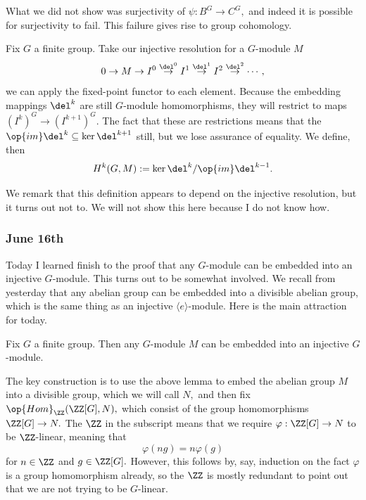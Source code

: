What we did not show was surjectivity of $\psi:B^G\to C^G,$ and indeed it is possible for surjectivity to fail. This failure gives rise to group cohomology.
\begin{definition}
    Fix $G$ a finite group. Take our injective resolution for a $G$-module $M$
    \[0\to M\to I^0\stackrel{\del^0}\to I^1\stackrel{\del^1}\to I^2\stackrel{\del^2}\to\cdots,\]
    we can apply the fixed-point functor to each element. Because the embedding mappings $\del^k$ are still $G$-module homomorphisms, they will restrict to maps $\left(I^k\right)^G\to\left(I^{k+1}\right)^G.$ The fact that these are restrictions means that the $\op{im}\del^k\subseteq\ker\del^{k+1}$ still, but we lose assurance of equality. We define, then
    \[H^k(G,M):=\ker\del^k/\op{im}\del^{k-1}.\]
\end{definition}
We remark that this definition appears to depend on the injective resolution, but it turns out not to. We will not show this here because I do not know how.

\subsubsection{June 16th}
Today I learned finish to the proof that any $G$-module can be embedded into an injective $G$-module. This turns out to be somewhat involved. We recall from yesterday that any abelian group can be embedded into a divisible abelian group, which is the same thing as an injective $\langle e\rangle$-module. Here is the main attraction for today.
\begin{proposition}
    Fix $G$ a finite group. Then any $G$-module $M$ can be embedded into an injective $G$-module.
\end{proposition}
The key construction is to use the above lemma to embed the abelian group $M$ into a divisible group, which we will call $N,$ and then fix $\op{Hom}_\ZZ(\ZZ[G],N),$ which consist of the group homomorphisms $\ZZ[G]\to N.$ The $\ZZ$ in the subscript means that we require $\varphi:\ZZ[G]\to N$ to be $\ZZ$-linear, meaning that
\[\varphi(ng)=n\varphi(g)\]
for $n\in\ZZ$ and $g\in\ZZ[G].$ However, this follows by, say, induction on the fact $\varphi$ is a group homomorphism already, so the $\ZZ$ is mostly redundant to point out that we are not trying to be $G$-linear.


